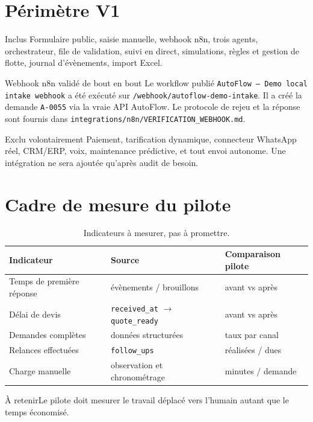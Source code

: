 \documentclass[11pt,a4paper,openany]{report}
\newcommand{\takeaway}[1]{\begin{keybox}{À retenir}#1\end{keybox}}
\begin{document}
\section{Périmètre V1}
\begin{keybox}{Inclus}
Formulaire public, saisie manuelle, webhook n8n, trois agents, orchestrateur, file de validation, suivi en direct, simulations, règles et gestion de flotte, journal d'évènements, import Excel.
\end{keybox}
\begin{keybox}{Webhook n8n validé de bout en bout}
Le workflow publié \texttt{AutoFlow -- Demo local intake webhook} a été exécuté sur \texttt{/webhook/autoflow-demo-intake}. Il a créé la demande \texttt{A-0055} via la vraie API AutoFlow. Le protocole de rejeu et la réponse sont fournis dans \texttt{integrations/n8n/VERIFICATION\_WEBHOOK.md}.
\end{keybox}
\begin{riskbox}{Exclu volontairement}
Paiement, tarification dynamique, connecteur WhatsApp réel, CRM/ERP, voix, maintenance prédictive, et tout envoi autonome. Une intégration ne sera ajoutée qu'après audit de besoin.
\end{riskbox}
\clearpage

\section{Cadre de mesure du pilote}
\begin{table}[H]\centering\small\caption{Indicateurs à mesurer, pas à promettre.}\begin{tabularx}{\linewidth}{X X X}\toprule
Indicateur & Source & Comparaison pilote\\\midrule
Temps de première réponse & évènements / brouillons & avant vs après\\
Délai de devis & \texttt{received\_at} $\rightarrow$ \texttt{quote\_ready} & avant vs après\\
Demandes complètes & données structurées & taux par canal\\
Relances effectuées & \texttt{follow\_ups} & réalisées / dues\\
Charge manuelle & observation et chronométrage & minutes / demande\\\bottomrule
\end{tabularx}\end{table}
\takeaway{Le pilote doit mesurer le travail déplacé vers l'humain autant que le temps économisé.}
\clearpage
\end{document}
